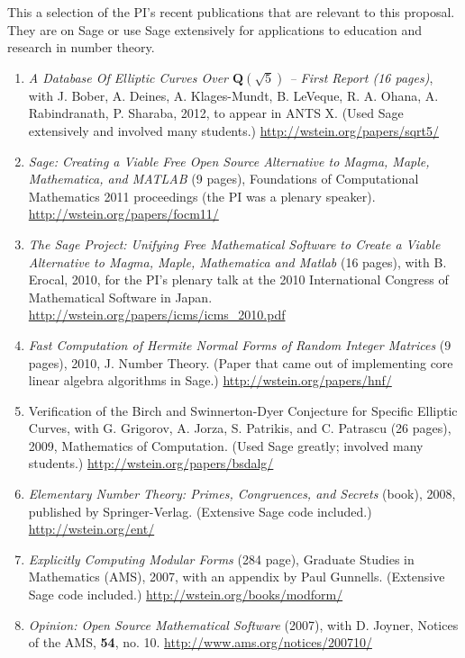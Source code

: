 \documentclass[11pt]{article}
\begin{document}
\noindent{}This a selection of the PI's recent publications that are
relevant to this proposal.  They are on Sage or use Sage extensively
for applications to education and research in number theory.


\begin{enumerate}\setlength{\itemsep}{0ex}

\item \emph{A Database Of Elliptic Curves Over $\mathbf{Q}(\sqrt{5})$ -- First
  Report (16 pages)}, with J. Bober, A. Deines, A. Klages-Mundt,
  B. LeVeque, R. A. Ohana, A. Rabindranath, P. Sharaba, 2012, to
  appear in ANTS X. (Used Sage extensively and involved many
  students.) \url{http://wstein.org/papers/sqrt5/}

\item \emph{Sage: Creating a Viable Free Open Source Alternative to
  Magma, Maple, Mathematica, and MATLAB} (9 pages), Foundations of
  Computational Mathematics 2011 proceedings (the PI was a plenary
  speaker). \url{http://wstein.org/papers/focm11/}

\item \emph{The Sage Project: Unifying Free Mathematical Software to
  Create a Viable Alternative to Magma, Maple, Mathematica and Matlab}
  (16 pages), with B. Erocal, 2010, for the PI's plenary talk at
  the 2010 International Congress of Mathematical Software in Japan.
\url{http://wstein.org/papers/icms/icms_2010.pdf}

\item \emph{Fast Computation of Hermite Normal Forms of Random Integer
  Matrices} (9 pages), 2010, J. Number Theory.  (Paper that came out
  of implementing core linear algebra algorithms in Sage.)
  \url{http://wstein.org/papers/hnf/}

 \item {\ptitle Verification of the Birch and Swinnerton-Dyer
   Conjecture for Specific Elliptic Curves}, with G. Grigorov, A.
   Jorza, S. Patrikis, and C. Patrascu (26 pages), 2009, 
   Mathematics of Computation.   (Used Sage greatly; involved many students.)
\url{http://wstein.org/papers/bsdalg/}

\item \emph{Elementary Number Theory: Primes, Congruences, and Secrets}
 (book), 2008, published by Springer-Verlag. (Extensive Sage code included.)
\url{http://wstein.org/ent/}

 \item \emph{Explicitly {C}omputing {M}odular {F}orms} (284 page),
 Graduate Studies in Mathematics (AMS), 
 2007, with an appendix by Paul Gunnells. (Extensive Sage code included.)
\url{http://wstein.org/books/modform/}

 \item \emph{Opinion: Open Source Mathematical Software} (2007), with
   D. Joyner, Notices of the AMS, {\bf 54}, no. 10.
\url{http://www.ams.org/notices/200710/}



\end{enumerate}
\end{document}
